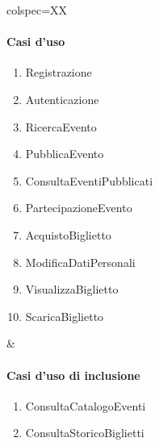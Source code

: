 \begin{table}[!hbp]
	\centering
	\begin{tblr}{colspec=XX}
		\begin{minipage}[t]{\linewidth}
			\paragraph{Casi d'uso}
			\begin{enumerate}[leftmargin=*]
				\item Registrazione 
				\item Autenticazione
				\item RicercaEvento
				\item PubblicaEvento
				\item ConsultaEventiPubblicati
				\item PartecipazioneEvento
				\item AcquistoBiglietto
				\item ModificaDatiPersonali
				\item VisualizzaBiglietto
				\item ScaricaBiglietto
			\end{enumerate}
		\end{minipage} &
		\begin{minipage}[t]{\linewidth}
			\paragraph{Casi d'uso di inclusione}
			\begin{enumerate}[leftmargin=*]
                \item ConsultaCatalogoEventi
	      \item ConsultaStoricoBiglietti
			\end{enumerate}

		\end{minipage}
	\end{tblr}
\end{table}
